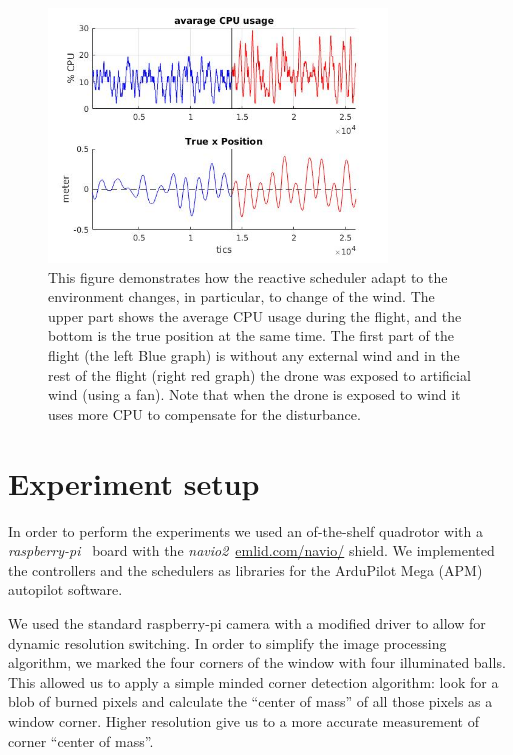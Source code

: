 \documentclass{sig-alternate-ipsn13}
\begin{document}
\begin{figure}[htbp]
    \centerline{\includegraphics[width=90mm]{windPlot15.jpg}}
    \caption{This figure demonstrates how the reactive scheduler adapt to the environment changes, in particular, to change of the wind. The upper part shows the average CPU usage during the flight, and the bottom is the true position at the same time. The first part of the flight (the left Blue graph) is without any external wind and in the rest of the flight (right red graph)  the drone was exposed to artificial wind (using a fan). Note that when the drone is exposed to wind it uses more CPU to compensate for the disturbance.}
    \label{fig:windPlot}
\end{figure}


\section{Experiment setup}
\label{sec:Experiment setup}

In order to perform the experiments we used an of-the-shelf quadrotor with a \textit{raspberry-pi}~\cite{pi2013raspberry} board with the \textit{navio2}~\url{emlid.com/navio/} shield. We implemented the controllers and the schedulers as libraries for the ArduPilot Mega (APM) autopilot software.

We used the standard raspberry-pi camera with a modified driver to allow for dynamic resolution switching. %
In order to simplify the image processing algorithm, we marked the four corners of the window with four illuminated balls. This allowed us to apply a simple minded corner detection algorithm: 
look for a blob of burned pixels and calculate the ``center of mass'' of all those pixels as a window corner. Higher resolution give us to a more accurate measurement of corner ``center of mass''.
\end{document}
